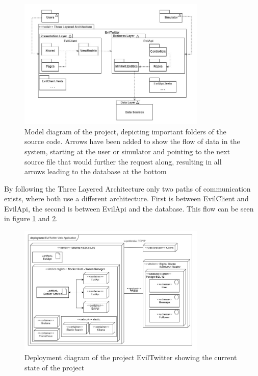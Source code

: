 \documentclass[report/main.tex]{subfiles}
\begin{document}
        \begin{figure}[H]
            \centering
            \includegraphics[width=0.8\textwidth]{report/images/EvilTwitter-Model Diagram - Evil Corp.jpg}
            \caption{Model diagram of the project, depicting important folders of the source code. Arrows have been added to show the flow of data in the system, starting at the user or simulator and pointing to the next source file that would further the request along, resulting in all arrows leading to the database at the bottom}
            \label{fig:model-diagram}
        \end{figure}
        
        By following the Three Layered Architecture only two paths of communication exists, where both use a different architecture. First is between EvilClient and EvilApi, the second is between EvilApi and the database. This flow can be seen in figure \ref{fig:model-diagram} and \ref{fig:deployment-diagram}.
        
        \begin{figure}
            \centering
            \includegraphics[width=0.8\textwidth]{report/images/EvilTwitter-Deployment Diagram - Evil Corp.jpg}
            \caption{Deployment diagram of the project EvilTwitter showing the current state of the project}
            \label{fig:deployment-diagram}
        \end{figure}
        
\end{document}
